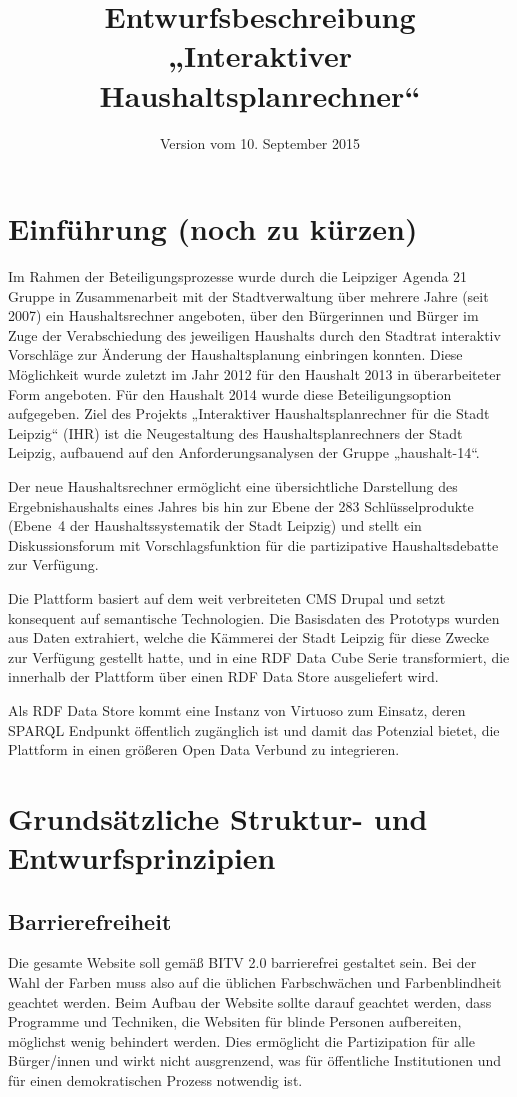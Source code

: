 \documentclass[a4paper,11pt,twoside]{article}
\title{Entwurfsbeschreibung „Interaktiver Haushaltsplanrechner“}
\date{Version vom 10. September 2015}
\begin{document}
\maketitle
\tableofcontents
\newpage
\seitezwei
\newpage

\section{Einführung (noch zu kürzen)}
Im Rahmen der Beteiligungsprozesse wurde durch die Leipziger Agenda 21 Gruppe
in Zusammenarbeit mit der Stadtverwaltung über mehrere Jahre (seit 2007) ein
Haushaltsrechner angeboten, über den Bürgerinnen und Bürger im Zuge der
Verabschiedung des jeweiligen Haushalts durch den Stadtrat interaktiv
Vorschläge zur Änderung der Haushaltsplanung einbringen konnten. Diese
Möglichkeit wurde zuletzt im Jahr 2012 für den Haushalt 2013 in überarbeiteter
Form angeboten. Für den Haushalt 2014 wurde diese Beteiligungsoption
aufgegeben. Ziel des Projekts „Interaktiver Haushaltsplanrechner für die Stadt
Leipzig“ (IHR) ist die Neugestaltung des Haushaltsplanrechners der Stadt
Leipzig, aufbauend auf den Anforderungsanalysen der Gruppe „haushalt-14“.

Der neue Haushaltsrechner ermöglicht eine übersichtliche Darstellung des
Ergebnishaushalts eines Jahres bis hin zur Ebene der 283 Schlüsselprodukte
(Ebene~4 der Haushaltssystematik der Stadt Leipzig) und stellt ein
Diskussionsforum mit Vorschlagsfunktion für die partizipative Haushaltsdebatte
zur Verfügung. 

Die Plattform basiert auf dem weit verbreiteten CMS Drupal und setzt
konsequent auf semantische Technologien. Die Basisdaten des Prototyps wurden
aus Daten extrahiert, welche die Kämmerei der Stadt Leipzig für diese Zwecke
zur Verfügung gestellt hatte, und in eine RDF Data Cube Serie transformiert,
die innerhalb der Plattform über einen RDF Data Store ausgeliefert wird.  

Als RDF Data Store kommt eine Instanz von Virtuoso zum Einsatz, deren SPARQL
Endpunkt öffentlich zugänglich ist und damit das Potenzial bietet, die
Plattform in einen größeren Open Data Verbund zu integrieren. 

\section{Grundsätzliche Struktur- und Entwurfsprinzipien}

\subsection{Barrierefreiheit}
Die gesamte Website soll gemäß BITV 2.0 \cite{bitv} barrierefrei gestaltet
sein. Bei der Wahl der Farben muss also auf die üblichen Farbschwächen und
Farbenblindheit geachtet werden. Beim Aufbau der Website sollte darauf
geachtet werden, dass Programme und Techniken, die Websiten für blinde
Personen aufbereiten, möglichst wenig behindert werden. Dies ermöglicht die
Partizipation für alle Bürger/innen und wirkt nicht ausgrenzend, was für
öffentliche Institutionen und für einen demokratischen Prozess notwendig ist.
\end{document}
